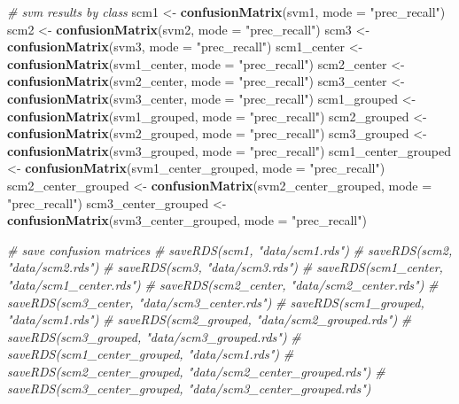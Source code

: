 \documentclass[12pt,twoside]{reedthesis}
\newenvironment{Shaded}{\begin{snugshade}}{\end{snugshade}}
\newcommand{\CommentTok}[1]{\textcolor[rgb]{0.56,0.35,0.01}{\textit{#1}}}
\newcommand{\DataTypeTok}[1]{\textcolor[rgb]{0.13,0.29,0.53}{#1}}
\newcommand{\KeywordTok}[1]{\textcolor[rgb]{0.13,0.29,0.53}{\textbf{#1}}}
\newcommand{\NormalTok}[1]{#1}
\newcommand{\StringTok}[1]{\textcolor[rgb]{0.31,0.60,0.02}{#1}}
\begin{document}
\begin{Shaded}
\begin{Highlighting}[]
{{{\CommentTok{# svm results by class}
\NormalTok{scm1 <-}\StringTok{ }\KeywordTok{confusionMatrix}\NormalTok{(svm1,  }\DataTypeTok{mode =} \StringTok{"prec_recall"}\NormalTok{)}
\NormalTok{scm2 <-}\StringTok{ }\KeywordTok{confusionMatrix}\NormalTok{(svm2,  }\DataTypeTok{mode =} \StringTok{"prec_recall"}\NormalTok{)}
\NormalTok{scm3 <-}\StringTok{ }\KeywordTok{confusionMatrix}\NormalTok{(svm3,  }\DataTypeTok{mode =} \StringTok{"prec_recall"}\NormalTok{)}
\NormalTok{scm1_center <-}\StringTok{ }\KeywordTok{confusionMatrix}\NormalTok{(svm1_center,  }\DataTypeTok{mode =} \StringTok{"prec_recall"}\NormalTok{)}
\NormalTok{scm2_center <-}\StringTok{ }\KeywordTok{confusionMatrix}\NormalTok{(svm2_center,  }\DataTypeTok{mode =} \StringTok{"prec_recall"}\NormalTok{)}
\NormalTok{scm3_center <-}\StringTok{ }\KeywordTok{confusionMatrix}\NormalTok{(svm3_center,  }\DataTypeTok{mode =} \StringTok{"prec_recall"}\NormalTok{)}
\NormalTok{scm1_grouped <-}\StringTok{ }\KeywordTok{confusionMatrix}\NormalTok{(svm1_grouped,  }\DataTypeTok{mode =} \StringTok{"prec_recall"}\NormalTok{)}
\NormalTok{scm2_grouped <-}\StringTok{ }\KeywordTok{confusionMatrix}\NormalTok{(svm2_grouped,  }\DataTypeTok{mode =} \StringTok{"prec_recall"}\NormalTok{)}
\NormalTok{scm3_grouped <-}\StringTok{ }\KeywordTok{confusionMatrix}\NormalTok{(svm3_grouped,  }\DataTypeTok{mode =} \StringTok{"prec_recall"}\NormalTok{)}
\NormalTok{scm1_center_grouped <-}\StringTok{ }\KeywordTok{confusionMatrix}\NormalTok{(svm1_center_grouped,  }\DataTypeTok{mode =} \StringTok{"prec_recall"}\NormalTok{)}
\NormalTok{scm2_center_grouped <-}\StringTok{ }\KeywordTok{confusionMatrix}\NormalTok{(svm2_center_grouped,  }\DataTypeTok{mode =} \StringTok{"prec_recall"}\NormalTok{)}
\NormalTok{scm3_center_grouped <-}\StringTok{ }\KeywordTok{confusionMatrix}\NormalTok{(svm3_center_grouped,  }\DataTypeTok{mode =} \StringTok{"prec_recall"}\NormalTok{)}

\CommentTok{# save confusion matrices}
\CommentTok{# saveRDS(scm1, "data/scm1.rds")}
\CommentTok{# saveRDS(scm2, "data/scm2.rds")}
\CommentTok{# saveRDS(scm3, "data/scm3.rds")}
\CommentTok{# saveRDS(scm1_center, "data/scm1_center.rds")}
\CommentTok{# saveRDS(scm2_center, "data/scm2_center.rds")}
\CommentTok{# saveRDS(scm3_center, "data/scm3_center.rds")}
\CommentTok{# saveRDS(scm1_grouped, "data/scm1.rds")}
\CommentTok{# saveRDS(scm2_grouped, "data/scm2_grouped.rds")}
\CommentTok{# saveRDS(scm3_grouped, "data/scm3_grouped.rds")}
\CommentTok{# saveRDS(scm1_center_grouped, "data/scm1.rds")}
\CommentTok{# saveRDS(scm2_center_grouped, "data/scm2_center_grouped.rds")}
\CommentTok{# saveRDS(scm3_center_grouped, "data/scm3_center_grouped.rds")}

}}}
\end{Highlighting}
\end{Shaded}
\end{document}
